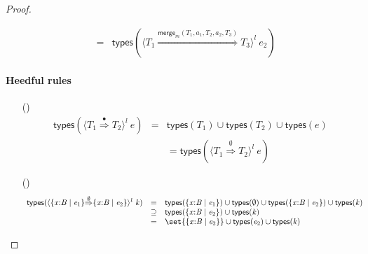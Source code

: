 \documentclass[9pt]{extarticle}
\newcommand{\ottnt}[1]{\mathit{#1}}
\begin{document}
\begin{lemma}
\begin{proof}
{\begin{itemize}
\[\begin{array}{rclr}
        &=&  \mathsf{types} (  \langle  \ottnt{T_{{\mathrm{1}}}}  \mathord{ \overset{  \mathsf{merge} _{ \ottnt{m} }( \ottnt{T_{{\mathrm{1}}}} , \ottnt{a_{{\mathrm{1}}}} , \ottnt{T_{{\mathrm{2}}}} , \ottnt{a_{{\mathrm{2}}}} , \ottnt{T_{{\mathrm{3}}}} )  }{\Rightarrow} }  \ottnt{T_{{\mathrm{3}}}}  \rangle^{ \ottnt{l} } ~  \ottnt{e_{{\mathrm{2}}}}  ) 
      \end{array} \]
    \end{itemize} 

    \paragraph{Heedful \lambdah rules}
\begin{itemize}
    \item[(\E{TypeSet})] \[ \begin{array}{rclr}
         \mathsf{types} (  \langle  \ottnt{T_{{\mathrm{1}}}}  \mathord{ \overset{ \bullet }{\Rightarrow} }  \ottnt{T_{{\mathrm{2}}}}  \rangle^{ \ottnt{l} } ~  \ottnt{e}  )  &=&    \mathsf{types} ( \ottnt{T_{{\mathrm{1}}}} )   \cup   \mathsf{types} ( \ottnt{T_{{\mathrm{2}}}} )    \cup   \mathsf{types} ( \ottnt{e} )   \\
        &&=  \mathsf{types} (  \langle  \ottnt{T_{{\mathrm{1}}}}  \mathord{ \overset{ \emptyset }{\Rightarrow} }  \ottnt{T_{{\mathrm{2}}}}  \rangle^{ \ottnt{l} } ~  \ottnt{e}  ) 
        \end{array} \]
    \item[(\E{CheckEmpty})]  \[ \begin{array}{rclr}
         \mathsf{types} (  \langle   \{ \mathit{x} \mathord{:} \ottnt{B} \mathrel{\mid} \ottnt{e_{{\mathrm{1}}}} \}   \mathord{ \overset{ \emptyset }{\Rightarrow} }   \{ \mathit{x} \mathord{:} \ottnt{B} \mathrel{\mid} \ottnt{e_{{\mathrm{2}}}} \}   \rangle^{ \ottnt{l} } ~  \ottnt{k}  )  &=&     \mathsf{types} (  \{ \mathit{x} \mathord{:} \ottnt{B} \mathrel{\mid} \ottnt{e_{{\mathrm{1}}}} \}  )   \cup   \mathsf{types} ( \emptyset )    \cup   \mathsf{types} (  \{ \mathit{x} \mathord{:} \ottnt{B} \mathrel{\mid} \ottnt{e_{{\mathrm{2}}}} \}  )    \cup   \mathsf{types} ( \ottnt{k} )   & \\
        &\supseteq&   \mathsf{types} (  \{ \mathit{x} \mathord{:} \ottnt{B} \mathrel{\mid} \ottnt{e_{{\mathrm{2}}}} \}  )   \cup   \mathsf{types} ( \ottnt{k} )   & \\
        &=&    \set{   \{ \mathit{x} \mathord{:} \ottnt{B} \mathrel{\mid} \ottnt{e_{{\mathrm{2}}}} \}   }   \cup   \mathsf{types} ( \ottnt{e_{{\mathrm{2}}}} )    \cup   \mathsf{types} ( \ottnt{k} )   & \\

\end{array}\]
\end{itemize}}
\end{proof}
\end{lemma}
\end{document}
